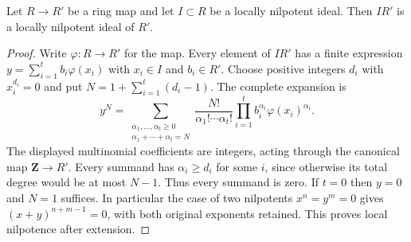 \begin{lemma}
\label{editorial-source-lemma-locally-nilpotent}
Let $R \to R'$ be a ring map and let $I \subset R$ be a locally nilpotent
ideal. Then $IR'$ is a locally nilpotent ideal of $R'$.
\end{lemma}

\begin{proof}
Write $\varphi:R\to R'$ for the map. Every element of $IR'$ has a
finite expression $y=\sum_{i=1}^t b_i\varphi(x_i)$ with $x_i\in I$
and $b_i\in R'$. Choose positive integers $d_i$ with $x_i^{d_i}=0$
and put $N=1+\sum_{i=1}^t(d_i-1)$. The complete expansion is
$$
y^N=\sum_{\substack{\alpha_1,\ldots,\alpha_t\geq0\\
\alpha_1+\cdots+\alpha_t=N}}
\frac{N!}{\alpha_1!\cdots\alpha_t!}
\prod_{i=1}^t b_i^{\alpha_i}\varphi(x_i)^{\alpha_i}.
$$
The displayed multinomial coefficients are integers, acting through
the canonical map $\mathbf Z\to R'$. Every summand has
$\alpha_i\geq d_i$ for some $i$, since otherwise its total degree
would be at most $N-1$. Thus every summand is zero. If $t=0$ then
$y=0$ and $N=1$ suffices. In particular the case of two nilpotents
$x^n=y^m=0$ gives $(x+y)^{n+m-1}=0$, with both original exponents
retained. This proves local nilpotence after extension.
\end{proof}